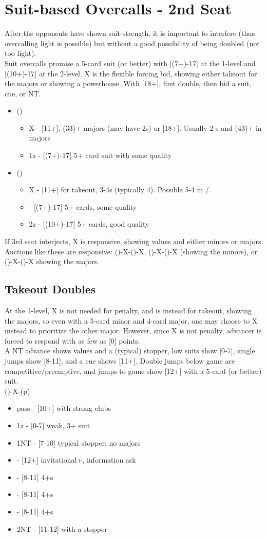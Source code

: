 \documentclass[12pt]{report}
\newcommand{\n}{\\}
\newcommand{\q}[1]{\multido{}{#1}{\qquad}}
\newcommand{\ul}[1]{\begin{itemize}#1\end{itemize}}
\newcommand{\li}[1]{\item[~] \q{#1}}
\begin{document}
\section{Suit-based Overcalls - 2nd Seat} \label{4:2}

    After the opponents have shown suit-strength, it is important to interfere (thus overcalling light is possible) but without a good possibility of being doubled (not too light). \n

    Suit overcalls promise a 5-card suit (or better) with [(7+)-17] at the 1-level and [(10+)-17] at the 2-level.  X is the flexible forcing bid, showing either takeout for the majors or showing a powerhouse.  With [18+], first double, then bid a suit, cue, or NT.

    \ul{
        \li0 () \ul{
            \li0 X - [11+], (33)+ majors (may have 2\di{}s) or [18+].  Usually 2-\cl{}s and (43)+ in majors
            \li0 1z - [(7+)-17] 5+ card suit with some quality
        }

        \li0 (\he1) \ul{
            \li0 X - [11+] for takeout, 3-4\sp{}s (typically 4).  Possible 5-4 in \di{}/\sp{}.
            \li0 \sp1 - [(7+)-17] 5+ cards, some quality
            \li0 2z - [(10+)-17] 5+ cards, good quality
        }
    }

    If 3rd seat interjects, X is responsive, showing values and either minors or majors.  Auctions like these are responsive: ()-X-()-X, ()-X-()-X (showing the minors), or ()-X-()-X showing the majors.

\subsection{Takeout Doubles}

    At the 1-level, X is not needed for penalty, and is instead for takeout, showing the majors, so even with a 5-card minor and 4-card major, one may choose to X instead to prioritize the other major. However, since X is not penalty, advancer is forced to respond with as few as [0] points.\n

    A NT advance shows values and a (typical) stopper, low suits show [0-7], single jumps show [8-11], and a cue shows [11+].  Double jumps below game are competitive/preemptive, and jumps to game show [12+] with a 5-card (or better) suit. \n
    
    ()-X-(p)
    \ul{
        \li0 pass - [10+] with strong clubs
        \li0 1z - [0-7] weak, 3+ suit
        \li0 1NT - [7-10] \cl{} typical stopper; no majors
        \li0 \cl2 - [12+] invitational+, information ask
        \li0 \di2 - [8-11] 4+\di{}s
        \li0 \he2 - [8-11] 4+\he{}s
        \li0 \sp2 - [8-11] 4+\sp{}s
        \li0 2NT - [11-12] with a stopper
    }
\end{document}
